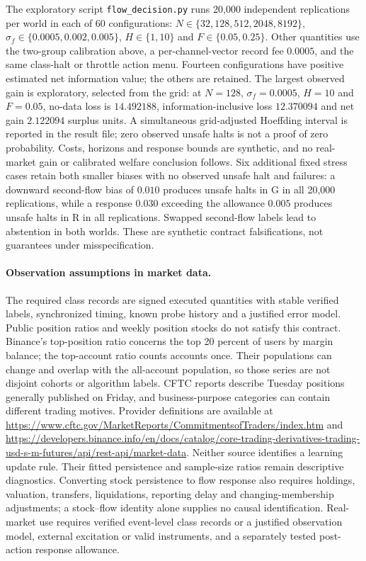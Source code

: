 \documentclass[12pt]{article}
\theoremstyle{definition}
\theoremstyle{remark}
\begin{document}
The exploratory script
\nolinkurl{flow_decision.py}
runs 20,000 independent replications per world in each of 60 configurations: $N\in\{32,\allowbreak128,\allowbreak512,\allowbreak2048,\allowbreak8192\}$, $\sigma_f\in\{0.0005,0.002,0.005\}$, $H\in\{1,10\}$ and $F\in\{0.05,0.25\}$. Other quantities use the two-group calibration above, a per-channel-vector record fee $0.0005$, and the same class-halt or throttle action menu. Fourteen configurations have positive estimated net information value; the others are retained. The largest observed gain is exploratory, selected from the grid: at $N=128$, $\sigma_f=0.0005$, $H=10$ and $F=0.05$, no-data loss is $14.492188$, information-inclusive loss $12.370094$ and net gain $2.122094$ surplus units. A simultaneous grid-adjusted Hoeffding interval is reported in the result file; zero observed unsafe halts is not a proof of zero probability. Costs, horizons and response bounds are synthetic, and no real-market gain or calibrated welfare conclusion follows. Six additional fixed stress cases retain both smaller biases with no observed unsafe halt and failures: a downward second-flow bias of $0.010$ produces unsafe halts in G in all 20,000 replications, while a response $0.030$ exceeding the allowance $0.005$ produces unsafe halts in R in all replications. Swapped second-flow labels lead to abstention in both worlds. These are synthetic contract falsifications, not guarantees under misspecification.

\paragraph{Observation assumptions in market data.}
The required class records are signed executed quantities with stable verified labels, synchronized timing, known probe history and a justified error model. Public position ratios and weekly position stocks do not satisfy this contract. Binance's top-position ratio concerns the top 20 percent of users by margin balance; the top-account ratio counts accounts once. Their populations can change and overlap with the all-account population, so those series are not disjoint cohorts or algorithm labels. CFTC reports describe Tuesday positions generally published on Friday, and business-purpose categories can contain different trading motives. Provider definitions are available at \url{https://www.cftc.gov/MarketReports/CommitmentsofTraders/index.htm} and \url{https://developers.binance.info/en/docs/catalog/core-trading-derivatives-trading-usd-s-m-futures/api/rest-api/market-data}. Neither source identifies a learning update rule. Their fitted persistence and sample-size ratios remain descriptive diagnostics. Converting stock persistence to flow response also requires holdings, valuation, transfers, liquidations, reporting delay and changing-membership adjustments; a stock--flow identity alone supplies no causal identification. Real-market use requires verified event-level class records or a justified observation model, external excitation or valid instruments, and a separately tested post-action response allowance.
\end{document}
